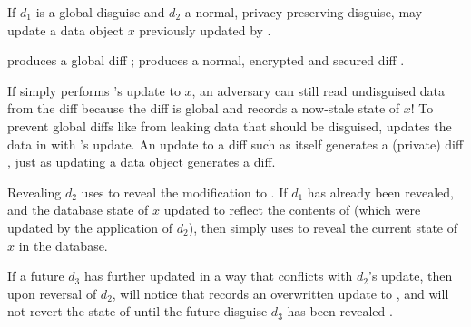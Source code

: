 If $d_1$ is a global disguise and $d_2$ a normal, privacy-preserving disguise,
 may update a data object $x$ previously updated by . 

 produces a global diff ;  produces a normal,
encrypted and secured diff .

If \sys simply performs 's update to $x$, an adversary can still read undisguised data
from the  diff because the diff is global and records a now-stale state of $x$!
%
To prevent global diffs like  from leaking data that should be disguised, \sys
updates the data in  with 's update. An update to a diff such as
 itself generates a (private) diff , just as updating a data
object generates a diff.

Revealing $d_2$ uses  to reveal the modification to . 
If $d_1$ has already been revealed, and the database state of $x$ updated to reflect the
contents of  (which were updated by the application of $d_2$), then \sys
simply uses  to reveal the current state of $x$ in the database. 

If a future $d_3$ has further updated  in a way that conflicts with $d_2$'s update, then
upon reversal of $d_2$, \sys will notice that  records an overwritten update to
, and will not revert the state of  until the future disguise $d_3$ has been
revealed .


\fi
